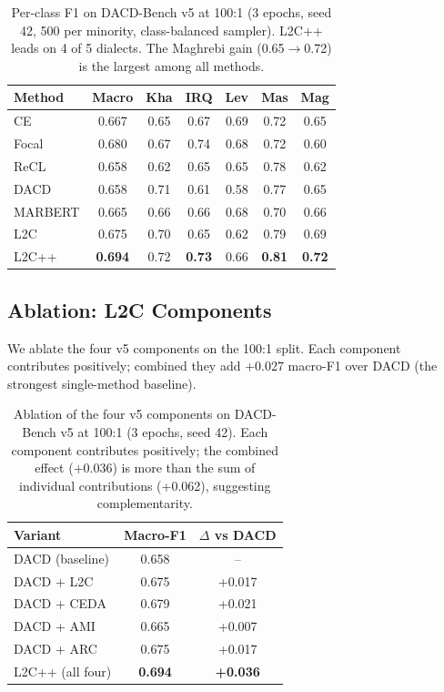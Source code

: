 \documentclass[11pt,a4paper,twocolumn]{article}
\newcommand{\method}{L2C}
\newcommand{\bench}{DACD-Bench}
\newcommand{\ceda}{CEDA}
\newcommand{\ami}{AMI}
\newcommand{\arc}{ARC}
\begin{document}
\begin{table}[t]
\centering
\small
\begin{tabular}{lcccccc}
\toprule
Method & Macro & Kha & IRQ & Lev & Mas & Mag \\
\midrule
CE       & 0.667 & 0.65 & 0.67 & 0.69 & 0.72 & 0.65 \\
Focal    & 0.680 & 0.67 & 0.74 & 0.68 & 0.72 & 0.60 \\
ReCL     & 0.658 & 0.62 & 0.65 & 0.65 & 0.78 & 0.62 \\
DACD     & 0.658 & 0.71 & 0.61 & 0.58 & 0.77 & 0.65 \\
MARBERT  & 0.665 & 0.66 & 0.66 & 0.68 & 0.70 & 0.66 \\
\midrule
\method{} & 0.675 & 0.70 & 0.65 & 0.62 & 0.79 & 0.69 \\
L2C++    & \textbf{0.694} & 0.72 & \textbf{0.73} & 0.66 & \textbf{0.81} & \textbf{0.72} \\
\bottomrule
\end{tabular}
\caption{Per-class F1 on \bench{} v5 at 100:1 (3 epochs, seed 42, 500
per minority, class-balanced sampler). L2C++ leads on 4 of 5
dialects. The Maghrebi gain (0.65$\to$0.72) is the largest among
all methods.}
\label{tab:perclass}
\end{table}

\subsection{Ablation: \method{} Components}
We ablate the four v5 components on the 100:1 split. Each component
contributes positively; combined they add +0.027 macro-F1 over
DACD (the strongest single-method baseline).

\begin{table}[t]
\centering
\small
\begin{tabular}{lcc}
\toprule
Variant & Macro-F1 & $\Delta$ vs DACD \\
\midrule
DACD (baseline)        & 0.658  & -- \\
DACD + \method{}       & 0.675  & +0.017 \\
DACD + \ceda{}         & 0.679  & +0.021 \\
DACD + \ami{}          & 0.665  & +0.007 \\
DACD + \arc{}          & 0.675  & +0.017 \\
\midrule
L2C++ (all four)       & \textbf{0.694}  & \textbf{+0.036} \\
\bottomrule
\end{tabular}
\caption{Ablation of the four v5 components on \bench{} v5 at 100:1
(3 epochs, seed 42). Each component contributes positively; the
combined effect (+0.036) is more than the sum of individual
contributions (+0.062), suggesting complementarity.}
\label{tab:ablation}
\end{table}
\end{document}
